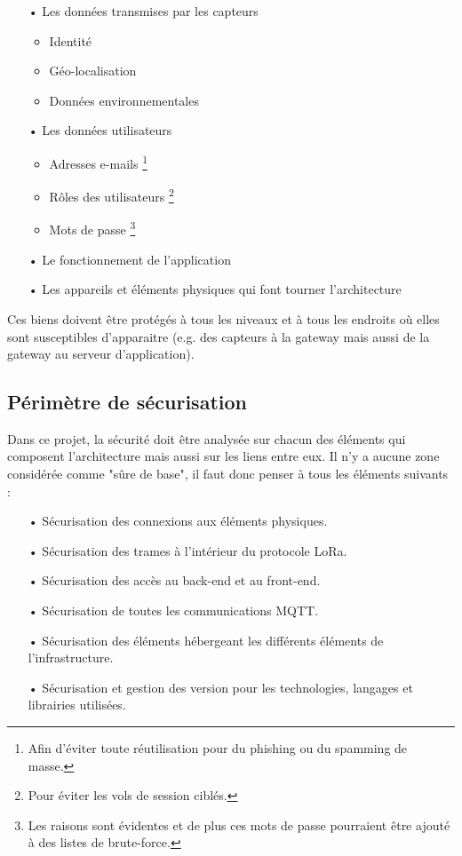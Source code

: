 \documentclass[12pt]{article}
\begin{document}
\begin{itemize}
\item[•] Les données transmises par les capteurs
\begin{itemize}
\item Identité
\item Géo-localisation
\item Données environnementales
\end{itemize}
\item[•] Les données utilisateurs
\begin{itemize}
\item Adresses e-mails \footnote{Afin d'éviter toute réutilisation pour du phishing ou du spamming de masse.}
\item Rôles des utilisateurs \footnote{Pour éviter les vols de session ciblés.}
\item Mots de passe \footnote{Les raisons sont évidentes et de plus ces mots de passe pourraient être ajouté à des listes de brute-force.}
\end{itemize}
\item[•] Le fonctionnement de l'application
\item[•] Les appareils et éléments physiques qui font tourner l'architecture
\end{itemize}

Ces biens doivent être protégés à tous les niveaux et à tous les endroits où elles sont susceptibles d'apparaitre (e.g. des capteurs à la gateway mais aussi de la gateway au serveur d'application).

\subsection{Périmètre de sécurisation}

Dans ce projet, la sécurité doit être analysée sur chacun des éléments qui composent l'architecture mais aussi sur les liens entre eux. Il n'y a aucune zone considérée comme "sûre de base", il faut donc penser à tous les éléments suivants :

\begin{itemize}
\item[•] Sécurisation des connexions aux éléments physiques.
\item[•] Sécurisation des trames à l'intérieur du protocole LoRa.
\item[•] Sécurisation des accès au back-end et au front-end.
\item[•] Sécurisation de toutes les communications MQTT.
\item[•] Sécurisation des éléments hébergeant les différents éléments de l'infrastructure.
\item[•] Sécurisation et gestion des version pour les technologies, langages et librairies utilisées.
\end{itemize}
\clearpage
\end{document}
